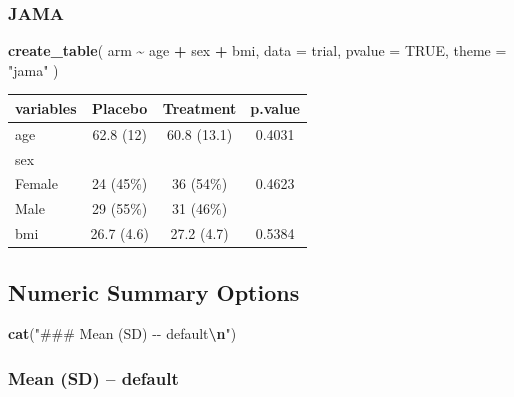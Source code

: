 \documentclass[
]{article}
\newenvironment{Shaded}{\begin{snugshade}}{\end{snugshade}}
\newcommand{\AttributeTok}[1]{\textcolor[rgb]{0.13,0.29,0.53}{#1}}
\newcommand{\ConstantTok}[1]{\textcolor[rgb]{0.56,0.35,0.01}{#1}}
\newcommand{\FunctionTok}[1]{\textcolor[rgb]{0.13,0.29,0.53}{\textbf{#1}}}
\newcommand{\NormalTok}[1]{#1}
\newcommand{\SpecialCharTok}[1]{\textcolor[rgb]{0.81,0.36,0.00}{\textbf{#1}}}
\newcommand{\StringTok}[1]{\textcolor[rgb]{0.31,0.60,0.02}{#1}}
\begin{document}
\subsubsection{JAMA}\label{jama}

\begin{Shaded}
\begin{Highlighting}[]
\FunctionTok{create\_table}\NormalTok{(}
\NormalTok{  arm }\SpecialCharTok{\textasciitilde{}}\NormalTok{ age }\SpecialCharTok{+}\NormalTok{ sex }\SpecialCharTok{+}\NormalTok{ bmi,}
  \AttributeTok{data =}\NormalTok{ trial,}
  \AttributeTok{pvalue =} \ConstantTok{TRUE}\NormalTok{,}
  \AttributeTok{theme =} \StringTok{"jama"}
\NormalTok{)}
\end{Highlighting}
\end{Shaded}

\begin{tabular}{lccc}
\toprule

\textbf{variables} & \textbf{Placebo} & \textbf{Treatment} & \textbf{p.value} \\
\midrule
age & 62.8 (12) & 60.8 (13.1) & 0.4031 \\
sex &  &  &  \\
\hspace{1em}Female & 24 (45\%) & 36 (54\%) & 0.4623 \\
\hspace{1em}Male & 29 (55\%) & 31 (46\%) &  \\
bmi & 26.7 (4.6) & 27.2 (4.7) & 0.5384 \\
\bottomrule
\end{tabular}

\subsection{Numeric Summary Options}\label{numeric-summary-options}

\begin{Shaded}
\begin{Highlighting}[]
\FunctionTok{cat}\NormalTok{(}\StringTok{"\#\#\# Mean (SD) {-}{-} default}\SpecialCharTok{\textbackslash{}n}\StringTok{"}\NormalTok{)}
\end{Highlighting}
\end{Shaded}

\subsubsection{Mean (SD) -- default}\label{mean-sd-default}
\end{document}
